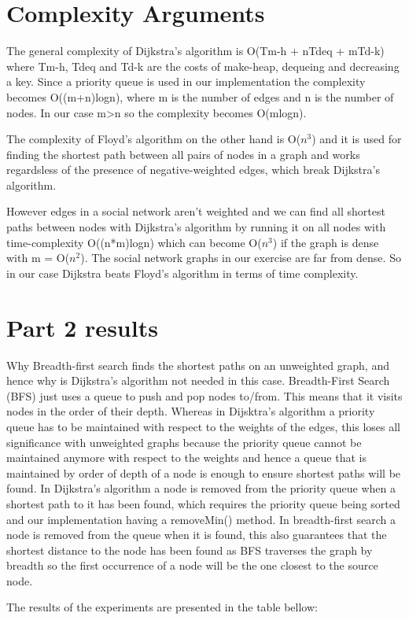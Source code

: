 \documentclass{article}
\begin{document}
\section{Complexity Arguments}
\label{sec:complexity}
The general complexity of Dijkstra's algorithm is O(Tm-h + nTdeq + mTd-k) where
Tm-h, Tdeq and Td-k are the costs of make-heap, dequeing and decreasing a key. Since
a priority queue is used in our implementation the complexity becomes O((m+n)logn),
where m is the number of edges and n is the number of nodes. In our case m>n so the
complexity becomes O(mlogn).\par
The complexity of Floyd's algorithm on the other hand is O($n^3$) and it is used for
finding the shortest path between all pairs of nodes in a graph and works regardsless
of the presence of negative-weighted edges, which break Dijkstra's algorithm. \par However
edges in a social network aren't weighted and we can find all shortest paths between
nodes with Dijkstra's algorithm by running it on all nodes with time-complexity
O((n*m)logn) which can become O($n^3$) if the graph is dense with m = O($n^2$). The social
network graphs in our exercise are far from dense. So in our case Dijkstra beats
Floyd's algorithm in terms of time complexity.


\section{Part 2 results}
\label{sec:part2}
Why Breadth-first search finds the shortest paths on an unweighted graph, and hence
why is Dijkstra's algorithm not needed in this case. Breadth-First Search (BFS) just
uses a queue to push and pop nodes to/from. This means that it visits nodes in the
order of their depth. Whereas in Dijsktra's algorithm a priority queue has to be maintained
with respect to the weights of the edges, this loses all significance with unweighted graphs
because the priority queue cannot be maintained anymore with respect to the weights and hence
a queue that is maintained by order of depth of a node is enough to ensure shortest paths will
be found. In Dijkstra's algorithm a node is removed from the priority queue when a shortest path
to it has been found, which requires the priority queue being sorted and our implementation
having a removeMin() method. In breadth-first search a node is removed from the queue when it is
found, this also guarantees that the shortest distance to the node has been found as BFS
traverses the graph by breadth so the first occurrence of a node will be the one closest to the
source node.\par
The results of the experiments are presented in the table bellow:
\end{document}
